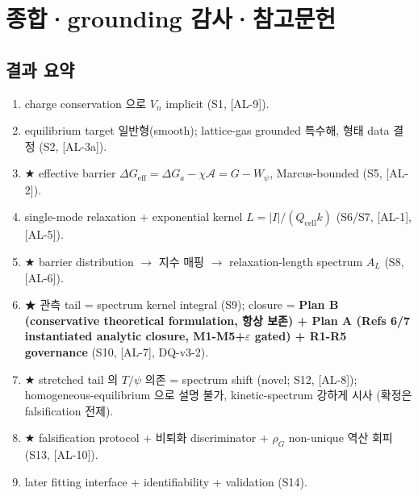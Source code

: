 \documentclass[11pt,a4paper]{article}
\newcommand{\eff}{\mathrm{eff}}
\newcommand{\cell}{\mathrm{cell}}
\newcommand{\AL}[1]{\textsf{[AL-#1]}}
\begin{document}
\section{종합·grounding 감사·참고문헌}\label{sec:summary}
\subsection{결과 요약}
\begin{enumerate}[label=\textbf{(R\arabic*)}]
\item charge conservation 으로 $V_n$ implicit (S1, \AL{9}).
\item equilibrium target 일반형(smooth); lattice-gas grounded 특수해, 형태 data 결정 (S2, \AL{3a}).
\item ★ effective barrier $\Delta G_\eff=\Delta G_a-\chi\mathcal A=G-W_\psi$, Marcus-bounded (S5, \AL{2}).
\item single-mode relaxation + exponential kernel $L=|I|/(Q_\cell k)$ (S6/S7, \AL{1},\AL{5}).
\item ★ barrier distribution $\to$ 지수 매핑 $\to$ relaxation-length spectrum $A_L$ (S8, \AL{6}).
\item ★ 관측 tail = spectrum kernel integral (S9); closure = \textbf{Plan B (conservative theoretical formulation, 항상 보존) + Plan A (Refs 6/7 instantiated analytic closure, M1-M5+$\varepsilon$ gated) +
  R1-R5 governance} (S10, \AL{7}, DQ-v3-2).
\item ★ stretched tail 의 $T/\psi$ 의존 = spectrum shift (novel; S12, \AL{8}); homogeneous-equilibrium 으로 설명 불가, kinetic-spectrum 강하게 시사 (확정은 falsification 전제).
\item ★ falsification protocol + 비퇴화 discriminator + $\rho_G$ non-unique 역산 회피 (S13, \AL{10}).
\item later fitting interface + identifiability + validation (S14).
\end{enumerate}
\end{document}
